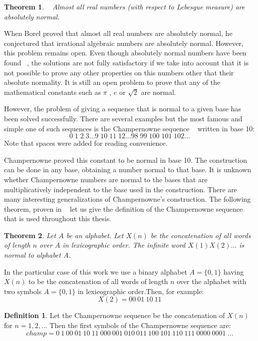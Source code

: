 \documentclass[11pt,a4paper]{tesis}
\newtheorem{theorem}{Theorem}[section]
\theoremstyle{definition}
\newtheorem{definition}{Definition}[section]
\begin{document}
\begin{theorem} ~\cite{Borel}
    Almost all real numbers (with respect to Lebesgue measure) are absolutely normal.
\end{theorem}

When Borel proved that almost all real numbers are absolutely normal, he conjectured that irrational algebraic numbers are absolutely normal. However, this problem remains open.
Even though absolutely normal numbers have been found ~\cite{Sierpinski}, the solutions are not fully satisfactory if we take into account that it is not possible to prove any other properties on this numbers other that their absolute normality.
It is still an open problem to prove that any of the mathematical constants such as $\pi$ , $e$ or $\sqrt{2}$ are normal.

However, the problem of giving a sequence that is normal to a given base has been solved successfully. There are several examples but the most famous and simple one of such sequences is the Champernowne sequence ~\cite{champern} written in base 10:
$$0 \; 1 \;2 \;3 \dots 9 \; 10 \; 11 \; 12 \dots 98 \; 99 \; 100 \; 101 \; 102 \dots$$ 
Note that spaces were added for reading convenience.


Champernowne proved this constant to be normal in base 10. The construction can be done in any base, obtaining a number normal to that base. It is unknown whether Champernowne numbers are normal to
the bases that are multiplicatively independent to the base used in the construction. There are many interesting generalizations of Champernowne's construction. The following theorem, proven in ~\cite{BC2018} let us give the definition of the Champernowne sequence that is used throughout this thesis.
\\

\begin{theorem}
    Let $A$ be an alphabet. Let $X(n)$ be the concatenation of all words of length $n$ over $A$ in lexicographic order.
     The infinite word $X(1)X(2)\dots$ is normal to alphabet $A$.
\end{theorem}

In the particular case of this work we use a binary alphabet  $A=\{0,1\}$ having $X(n)$ to be the concatenation of all words of length $n$ over the alphabet with two symbols $A=\{0,1\}$ in lexicographic order.Then, for example:
$$X(2) = 00 \: 01 \: 10 \: 11$$

\begin{definition}
Let the Champernowne sequence be the concatenation of $X(n)$ for $n = 1,2,\dots$ Then the first symbols of the Champernowne sequence are:
$$champ = 0 \: 1 \: 00 \: 01 \: 10 \: 11 \: 000 \: 001 \: 010 \: 011 \: 100 \: 101 \: 110 \: 111 \: 0000 \: 0001 \: \dots$$
\end{definition}
\end{document}

